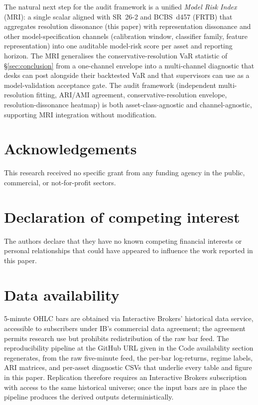 \documentclass[preprint,12pt,authoryear]{elsarticle}
\begin{document}
The natural next step for the audit framework is a unified \emph{Model Risk Index} (MRI): a single scalar aligned with SR~26-2 and BCBS~d457 (FRTB) that aggregates resolution dissonance (this paper) with representation dissonance \citep{companion_rep} and other model-specification channels (calibration window, classifier family, feature representation) into one auditable model-risk score per asset and reporting horizon. The MRI generalises the conservative-resolution VaR statistic of \S\ref{sec:conclusion} from a one-channel envelope into a multi-channel diagnostic that desks can post alongside their backtested VaR and that supervisors can use as a model-validation acceptance gate. The audit framework (independent multi-resolution fitting, ARI/AMI agreement, conservative-resolution envelope, resolution-dissonance heatmap) is both asset-class-agnostic and channel-agnostic, supporting MRI integration without modification.

\section*{Acknowledgements}

This research received no specific grant from any funding agency in the public, commercial, or not-for-profit sectors.

\section*{Declaration of competing interest}

The authors declare that they have no known competing financial interests or personal relationships that could have appeared to influence the work reported in this paper.

\section*{Data availability}

5-minute OHLC bars are obtained via Interactive Brokers' historical data service, accessible to subscribers under IB's commercial data agreement; the agreement permits research use but prohibits redistribution of the raw bar feed. The reproducibility pipeline at the GitHub URL given in the Code availability section regenerates, from the raw five-minute feed, the per-bar log-returns, regime labels, ARI matrices, and per-asset diagnostic CSVs that underlie every table and figure in this paper. Replication therefore requires an Interactive Brokers subscription with access to the same historical universe; once the input bars are in place the pipeline produces the derived outputs deterministically.
\end{document}
